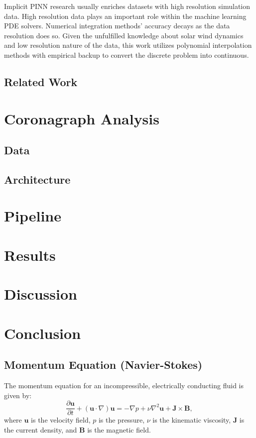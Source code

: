 \documentclass[12pt]{article}
\begin{document}
Implicit PINN research usually enriches datasets with high resolution simulation data. High resolution data plays an important role within the machine learning PDE solvers. Numerical integration methods' accuracy decays as the data resolution does so.
Given the unfulfilled knowledge about solar wind dynamics and low resolution nature of the data, this work utilizes polynomial interpolation methods with empirical backup \cite{DBLP:journals/corr/abs-2109-07143} to convert the discrete problem into continuous.

\subsection{Related Work}

\section{Coronagraph Analysis}

\subsection{Data}

\subsection{Architecture}

\section{Pipeline}

\section{Results}

\section{Discussion}

\section{Conclusion}

\subsection{Momentum Equation (Navier-Stokes)}
The momentum equation for an incompressible, electrically conducting fluid is given by:
\begin{equation}
\frac{\partial \mathbf{u}}{\partial t} + (\mathbf{u} \cdot \nabla) \mathbf{u} = -\nabla p + \nu \nabla^2 \mathbf{u} + \mathbf{J} \times \mathbf{B},
\end{equation}
where \( \mathbf{u} \) is the velocity field, \( p \) is the pressure, \( \nu \) is the kinematic viscosity, \( \mathbf{J} \) is the current density, and \( \mathbf{B} \) is the magnetic field.
\end{document}
